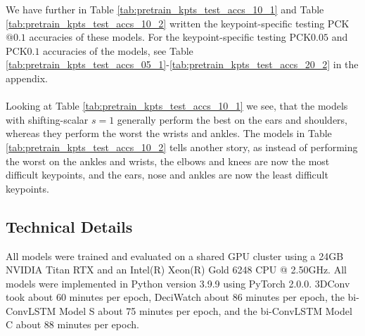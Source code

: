 \documentclass[./main.tex]{subfiles}
\begin{document}
\noindent We have further in Table \ref{tab:pretrain_kpts_test_accs_10_1} and Table \ref{tab:pretrain_kpts_test_accs_10_2} written the keypoint-specific testing PCK$@0.1$ accuracies of these models. For the keypoint-specific testing PCK$0.05$ and PCK$0.1$ accuracies of the models, see Table \ref{tab:pretrain_kpts_test_accs_05_1}-\ref{tab:pretrain_kpts_test_accs_20_2} in the appendix.
\\
\\
Looking at Table \ref{tab:pretrain_kpts_test_accs_10_1} we see, that the models with shifting-scalar $s = 1$ generally perform the best on the ears and shoulders, whereas they perform the worst the wrists and ankles. The models in Table \ref{tab:pretrain_kpts_test_accs_10_2} tells another story, as instead of performing the worst on the ankles and wrists, the elbows and knees are now the most difficult keypoints, and the ears, nose and ankles are now the least difficult keypoints.

\subsection{Technical Details}
\label{sec:pretrain_tech_details}
All models were trained and evaluated on a shared GPU cluster using a 24GB NVIDIA Titan RTX and an Intel(R) Xeon(R) Gold 6248 CPU @ 2.50GHz. All models were implemented in Python version 3.9.9 using PyTorch 2.0.0. 3DConv took about 60 minutes per epoch, DeciWatch about 86 minutes per epoch, the bi-ConvLSTM Model S about 75 minutes per epoch, and the bi-ConvLSTM Model C about 88 minutes per epoch.
\end{document}
